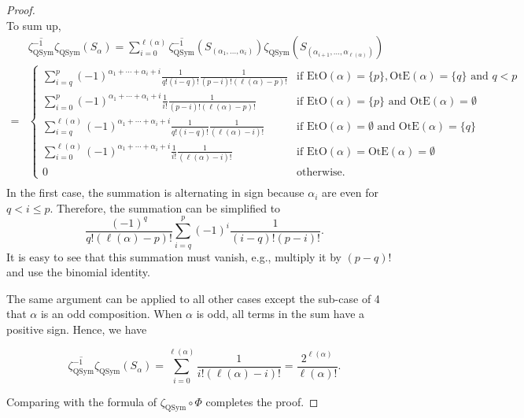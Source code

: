 \documentclass[10pt,a4paper]{amsart}
\newcommand{\EtO}{\mathrm{EtO}}
\newcommand{\OtE}{\mathrm{OtE}}
\newcommand{\QSym}{\mathrm{QSym}}
\begin{document}
\begin{proof}
\begin{equation}
	\end{equation}
	To sum up,
	\begin{align*}
	&\overline{\zeta_\QSym^{-1}}\zeta_\QSym(S_\alpha)=\sum_{i=0}^{\ell(\alpha)}\overline{\zeta_\QSym^{-1}}(S_{(\alpha_1,\dots,\alpha_i)})\zeta_\QSym(S_{(\alpha_{i+1},\dots,\alpha_{\ell(\alpha)})})\\
	=&\left\{\begin{array}{cc}
	\displaystyle\sum_{i=q}^p(-1)^{\alpha_1+\cdots+\alpha_i+i}\frac{1}{q!(i-q)!}\frac{1}{(p-i)!(\ell(\alpha)-p)!} & \text{if }\EtO(\alpha)=\{p\},\OtE(\alpha)=\{q\}\text{ and }q<p\\
	\displaystyle\sum_{i=0}^p(-1)^{\alpha_1+\cdots+\alpha_i+i}\frac{1}{i!}\frac{1}{(p-i)!(\ell(\alpha)-p)!} & \text{if }\EtO(\alpha)=\{p\}\text{ and }\OtE(\alpha)=\emptyset\\
	\displaystyle\sum_{i=q}^{\ell(\alpha)}(-1)^{\alpha_1+\cdots+\alpha_i+i}\frac{1}{q!(i-q)!}\frac{1}{(\ell(\alpha)-i)!} & \text{if }\EtO(\alpha)=\emptyset\text{ and }\OtE(\alpha)=\{q\}\\
	\displaystyle\sum_{i=0}^{\ell(\alpha)}(-1)^{\alpha_1+\cdots+\alpha_i+i}\frac{1}{i!}\frac{1}{(\ell(\alpha)-i)!} & \text{if }\EtO(\alpha)=\OtE(\alpha)=\emptyset\\
	0 & \text{otherwise.}
	\end{array}\right.\\
	\end{align*}
	In the first case, the summation is alternating in sign because $\alpha_i$ are even for $q< i\leq p$. Therefore, the summation can be simplified to
	$$\frac{(-1)^q}{q!(\ell(\alpha)-p)!}\sum_{i=q}^p(-1)^{i}\frac{1}{(i-q)!(p-i)!}.$$
	It is easy to see that this summation must vanish, e.g., multiply it by $(p-q)!$ and use the binomial identity.
	
	The same argument can be applied to all other cases except the sub-case of 4 that $\alpha$ is an odd composition. When $\alpha$ is odd, all terms in the sum have a positive sign. Hence, we have
	
	$$\overline{\zeta_\QSym^{-1}}\zeta_\QSym(S_\alpha)=\sum_{i=0}^{\ell(\alpha)}\frac{1}{i!(\ell(\alpha)-i)!}=\frac{2^{\ell(\alpha)}}{\ell(\alpha)!}.$$
	
	Comparing with the formula of $\zeta_\QSym\circ\Phi$ completes the proof.
\end{proof}
\end{document}

